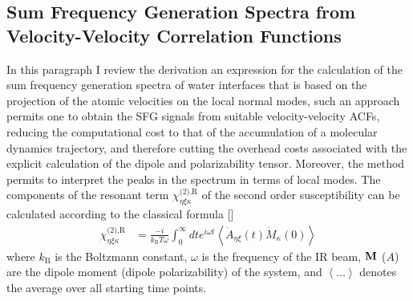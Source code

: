 \subsection{Sum Frequency Generation Spectra from Velocity-Velocity Correlation Functions}
In this paragraph I review the derivation an expression for the calculation of the sum frequency generation spectra of water interfaces that is
based on the projection of the atomic velocities on the local normal modes, such an approach permits one to obtain the SFG signals from suitable
velocity-velocity ACFs, reducing the computational cost to that of the accumulation of a molecular dynamics trajectory, and therefore cutting 
the overhead costs associated with the explicit calculation of the dipole and polarizability tensor. Moreover, the method permits to interpret 
the peaks in the spectrum in terms of local modes.
The components of the resonant term $\chi^{\text{(2),R}}_{\eta\xi\kappa}$ of the second order susceptibility can be calculated 
according to the classical formula [\cite{Morita02,Morita2008,Nihonyanagi2011}]
\begin{align}
  \chi^{\text{(2),R}}_{\eta\xi\kappa}&=\frac{-i}{k_{\text{B}}T \omega} \int_0^\infty dt e^{i\omega t}\left\langle \dot{A}_{\eta\xi}(t) \dot{M}_{\kappa}(0)\right\rangle 
 \label{eq:chi}
\end{align}
where $k_{\text{B}}$ is the Boltzmann constant, $\omega$ is the frequency of the IR beam, ${\bf M}$ (${A}$) are the dipole 
moment (dipole polarizability) of the system, and $\left\langle\dots\right\rangle$ denotes the average over all starting time points. 
 
